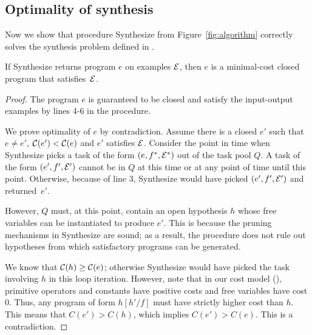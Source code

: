 


\subsection{Optimality of synthesis}

Now we show that  procedure {\sc Synthesize} from Figure~\ref{fig:algorithm} correctly solves the
synthesis problem defined in .

\begin{theorem}
If {\sc Synthesize} returns program $e$ on  examples
$\mathcal{E}$, then  $e$ is a minimal-cost closed program that satisfies~$\mathcal{E}$.
\end{theorem}

\begin{proof} 
The program $e$ is guaranteed to be closed and satisfy the
input-output examples by lines 4-6 in the procedure.

We prove  optimality of $e$ by contradiction. Assume  there is
a closed  $e'$ such that $e \ne e'$, $\mathcal{C}(e') < \mathcal{C}(e)$ and $e'$
satisfies $\mathcal{E}$.
Consider the point  in time when {\sc Synthesize} picks a task of the form
$(e, f^*, \mathcal{E}^*)$ out of the task pool $Q$.
A task of the form $(e', f', \mathcal{E}')$ cannot be  in $Q$ at this
time or at any point of time until this point.  Otherwise, because of
line 3, {\sc Synthesize} would have picked $(e', f',\mathcal{E}')$ and returned~$e'$.

However, $Q$ must, at this point, contain an open hypothesis $h$ whose
free variables can be instantiated to produce $e'$. This is because the
pruning mechanisms in {\sc Synthesize} are sound; as a result, the
procedure does not rule out hypotheses from which satisfactory
programs can be generated.

We know that $\mathcal{C}(h) \ge \mathcal{C}(e)$; otherwise {\sc Synthesize} would have
picked the task involving $h$ in this loop iteration. However, note
that in our cost model (), primitive operators and
constants have positive costs and free variables have cost 0. Thus, any
program of form $h[h'/f]$ must  have strictly higher cost
than $h$. This means that $C(e') > C(h)$, which implies  $C(e') >
C(e)$. This is a contradiction.
\end{proof}
